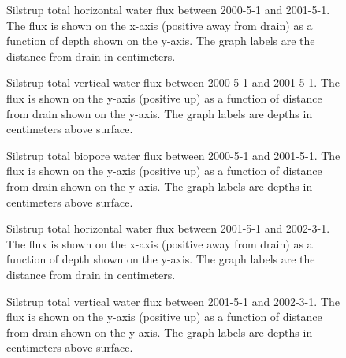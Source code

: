 \begin{figure}[htbp]
  \centering
  
  \caption{Silstrup total horizontal water flux between 2000-5-1 and
    2001-5-1.  The flux is shown on the x-axis (positive away from
    drain) as a function of depth shown on the y-axis.  The graph
    labels are the distance from drain in centimeters.}
  \label{fig:Silstrup-water-2000-horizontal}
\end{figure}\FloatBarrier

\begin{figure}[htbp]
  \centering
  
  \caption{Silstrup total vertical water flux between 2000-5-1 and
    2001-5-1.  The flux is shown on the y-axis (positive up) as a
    function of distance from drain shown on the y-axis.  The graph
    labels are depths in centimeters above surface.}
  \label{fig:Silstrup-water-2000}
\end{figure}\FloatBarrier

\begin{figure}[htbp]
  \centering
  
  \caption{Silstrup total biopore water flux between 2000-5-1 and
    2001-5-1.  The flux is shown on the y-axis (positive up) as a
    function of distance from drain shown on the y-axis.  The graph
    labels are depths in centimeters above surface.}
  \label{fig:Silstrup-water-biopore-2000}
\end{figure}\FloatBarrier

\begin{figure}[htbp]
  \centering
  
  \caption{Silstrup total horizontal water flux between 2001-5-1 and
    2002-3-1.  The flux is shown on the x-axis (positive away from
    drain) as a function of depth shown on the y-axis.  The graph
    labels are the distance from drain in centimeters.}
  \label{fig:Silstrup-water-2001-horizontal}
\end{figure}\FloatBarrier

\begin{figure}[htbp]
  \centering
  
  \caption{Silstrup total vertical water flux between 2001-5-1 and
    2002-3-1.  The flux is shown on the y-axis (positive up) as a
    function of distance from drain shown on the y-axis.  The graph
    labels are depths in centimeters above surface.}
  \label{fig:Silstrup-water-2001}
\end{figure}\FloatBarrier

